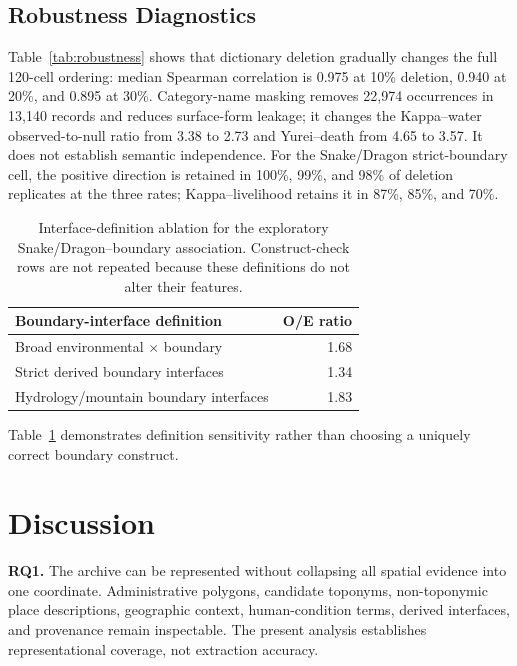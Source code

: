 \documentclass[9pt,twocolumn,a4paper]{extarticle}
\begin{document}
\subsection{Robustness Diagnostics}

Table~\ref{tab:robustness} shows that dictionary deletion gradually changes the full 120-cell ordering: median Spearman correlation is 0.975 at 10\% deletion, 0.940 at 20\%, and 0.895 at 30\%. Category-name masking removes 22,974 occurrences in 13,140 records and reduces surface-form leakage; it changes the Kappa--water observed-to-null ratio from 3.38 to 2.73 and Yurei--death from 4.65 to 3.57. It does not establish semantic independence. For the Snake/Dragon strict-boundary cell, the positive direction is retained in 100\%, 99\%, and 98\% of deletion replicates at the three rates; Kappa--livelihood retains it in 87\%, 85\%, and 70\%.



\begin{table}[t]
\centering
\small
\begin{tabular}{lr}
\toprule
Boundary-interface definition & O/E ratio \\
\midrule
Broad environmental \(\times\) boundary & 1.68 \\
Strict derived boundary interfaces & 1.34 \\
Hydrology/mountain boundary interfaces & 1.83 \\
\bottomrule
\end{tabular}
\caption{Interface-definition ablation for the exploratory Snake/Dragon--boundary association. Construct-check rows are not repeated because these definitions do not alter their features.}
\label{tab:interface-ablation}
\end{table}

Table~\ref{tab:interface-ablation} demonstrates definition sensitivity rather than choosing a uniquely correct boundary construct.

\section{Discussion}

\textbf{RQ1.} The archive can be represented without collapsing all spatial evidence into one coordinate. Administrative polygons, candidate toponyms, non-toponymic place descriptions, geographic context, human-condition terms, derived interfaces, and provenance remain inspectable. The present analysis establishes representational coverage, not extraction accuracy.
\end{document}

